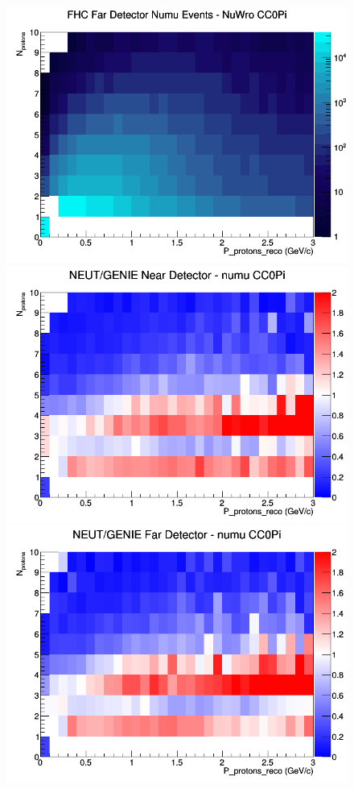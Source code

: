\begin{figure}[h]
\endminipage
{}
\includegraphics[width=\linewidth]{eff_N_P/LAr/protons/CC0Pi_FHC_FD_numu_N_P_NuWro.png}
\endminipage
\newline
{}
\includegraphics[width=\linewidth]{eff_N_P/LAr/protons/ratios/CC0Pi_NEUT_GENIE_numu_near_N_P.png}
\endminipage
{}
\includegraphics[width=\linewidth]{eff_N_P/LAr/protons/ratios/CC0Pi_NEUT_GENIE_numu_far_N_P.png}

\end{figure}
